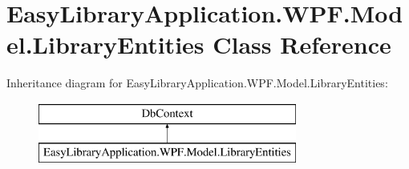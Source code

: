 \hypertarget{class_easy_library_application_1_1_w_p_f_1_1_model_1_1_library_entities}{}\section{Easy\+Library\+Application.\+W\+P\+F.\+Model.\+Library\+Entities Class Reference}
\label{class_easy_library_application_1_1_w_p_f_1_1_model_1_1_library_entities}
Inheritance diagram for Easy\+Library\+Application.\+W\+P\+F.\+Model.\+Library\+Entities\+:\begin{figure}[H]
\begin{center}
\leavevmode
\includegraphics[height=2.000000cm]{class_easy_library_application_1_1_w_p_f_1_1_model_1_1_library_entities}
\end{center}
\end{figure}
